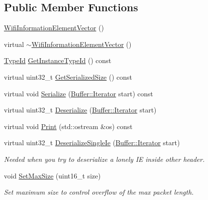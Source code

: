 \subsection*{Public Member Functions}
\begin{DoxyCompactItemize}
\item 
\hyperlink{classns3_1_1WifiInformationElementVector_a1311db9698e2e53179bc2d669129a346}{Wifi\+Information\+Element\+Vector} ()
\item 
virtual \hyperlink{classns3_1_1WifiInformationElementVector_ae25934154cb4efb7407dd9a7977fa3ab}{$\sim$\+Wifi\+Information\+Element\+Vector} ()
\item 
\hyperlink{classns3_1_1TypeId}{Type\+Id} \hyperlink{classns3_1_1WifiInformationElementVector_ab60ec8be938f81ff00aee6185676cd0b}{Get\+Instance\+Type\+Id} () const 
\item 
virtual uint32\+\_\+t \hyperlink{classns3_1_1WifiInformationElementVector_aeec5b714bbb83060b54b7edf4ad9b2f9}{Get\+Serialized\+Size} () const 
\item 
virtual void \hyperlink{classns3_1_1WifiInformationElementVector_a6d5586b7812ac70ca2d1a875983839c3}{Serialize} (\hyperlink{classns3_1_1Buffer_1_1Iterator}{Buffer\+::\+Iterator} start) const 
\item 
virtual uint32\+\_\+t \hyperlink{classns3_1_1WifiInformationElementVector_a251b746f2d3a1918a252072b65a53ae5}{Deserialize} (\hyperlink{classns3_1_1Buffer_1_1Iterator}{Buffer\+::\+Iterator} start)
\item 
virtual void \hyperlink{classns3_1_1WifiInformationElementVector_a6ece6df025a3aa34da8c36034c93d178}{Print} (std\+::ostream \&os) const 
\item 
virtual uint32\+\_\+t \hyperlink{classns3_1_1WifiInformationElementVector_a32022e208d24117b6f8ef243d92550e0}{Deserialize\+Single\+Ie} (\hyperlink{classns3_1_1Buffer_1_1Iterator}{Buffer\+::\+Iterator} start)
\begin{DoxyCompactList}\small\item\em Needed when you try to deserialize a lonely IE inside other header. \end{DoxyCompactList}\item 
void \hyperlink{classns3_1_1WifiInformationElementVector_aec77ae794161f47cda03a4ed31f8105c}{Set\+Max\+Size} (uint16\+\_\+t size)
\begin{DoxyCompactList}\small\item\em Set maximum size to control overflow of the max packet length. \end{DoxyCompactList}\item 

\end{DoxyCompactItemize}
